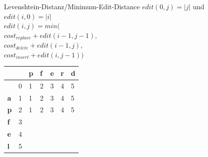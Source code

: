 \documentclass[aspectratio=169]{beamer}
\begin{document}
\begin{frame}[fragile]{Levenshtein-Distanz/Minimum-Edit-Distance}
$edit(0,j)=|j|$ und $edit(i,0)=|i|$\\
$edit(i,j)=min($\\
$cost_{replace} + edit(i-1,j-1),  $\\
$cost_{delete}+ edit(i-1,j),$\\
$cost_{insert}+ edit(i,j-1))  $\\
\begin{table}[]
\begin{tabular}{|l|l|l|l|l|l|l|}
\hline
           & \textbf{} & \textbf{p} & \textbf{f} & \textbf{e} & \textbf{r} & \textbf{d} \\ \hline
\textbf{}  & 0         & 1          & 2          & 3          & 4          & 5          \\ \hline
\textbf{a} & 1         & 1          & 2          & 3          & 4          & 5          \\ \hline
\textbf{p} & 2         & 1          & 2          & 3          & 4          & 5          \\ \hline
\textbf{f} & 3         &            &            &            &            &            \\ \hline
\textbf{e} & 4         &            &            &            &            &            \\ \hline
\textbf{l} & 5         &            &            &            &            &            \\ \hline
\end{tabular}
\end{table}
\end{frame}
 
\end{document}
